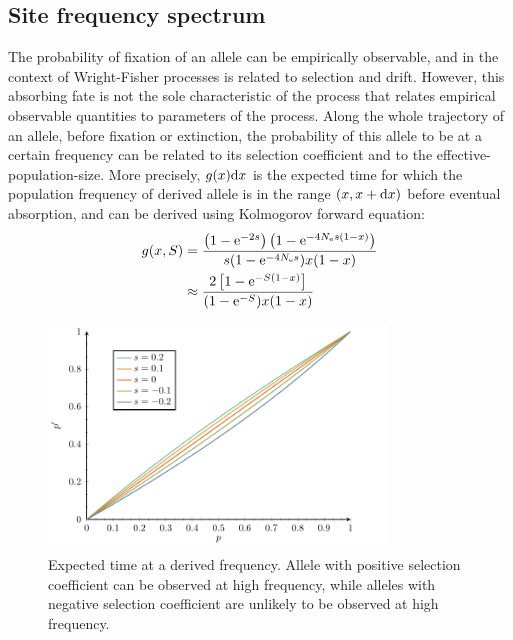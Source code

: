 \subsection{Site frequency spectrum}
The probability of fixation of an \gls{allele} can be empirically observable, and in the context of Wright-Fisher processes is related to selection and drift.
However, this absorbing fate is not the sole characteristic of the process that relates empirical observable quantities to parameters of the process.
Along the whole trajectory of an \gls{allele}, before fixation or extinction, the probability of this \gls{allele} to be at a certain frequency can be related to its selection coefficient and to the \gls{effective-population-size}.
More precisely, $g(x) \mathrm{d} x $ is the expected time for which the population frequency of derived \gls{allele} is in the range $(x, x+\mathrm{d} x)$ before eventual absorption, and can be derived using Kolmogorov forward equation:
\begin{align}
    g(x, S) & = \dfrac{\left( 1 - \mathrm{e}^{- 2 s }\right) \left( 1 - \mathrm{e}^{-4 N_{\textrm{e}} s(1-x)}\right)}{ s (1 - \mathrm{e}^{-4 N_{\textrm{e}} s})x(1-x)} \\
    & \approx \dfrac{2 \left[ 1 - \mathrm{e}^{-S(1-x)}\right]}{(1 - \mathrm{e}^{-S})x(1-x)} \label{eq:expected_time}
\end{align}

\begin{figure}[H]
    \centering
    \includegraphics[width=0.8\textwidth, page=4] {figures.pdf}
    \caption[Expected time at a derived frequency]{
    Expected time at a derived frequency.
    Allele with positive selection coefficient can be observed at high frequency, while \glspl{allele} with negative selection coefficient are unlikely to be observed at high frequency.}
\end{figure}


